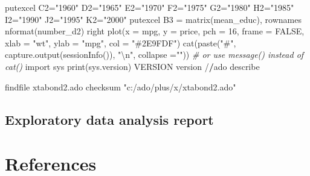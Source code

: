 \documentclass[
  12pt,
]{article}
\newenvironment{Shaded}{\begin{snugshade}}{\end{snugshade}}
\newcommand{\AttributeTok}[1]{\textcolor[rgb]{0.77,0.63,0.00}{#1}}
\newcommand{\CommentTok}[1]{\textcolor[rgb]{0.56,0.35,0.01}{\textit{#1}}}
\newcommand{\ConstantTok}[1]{\textcolor[rgb]{0.00,0.00,0.00}{#1}}
\newcommand{\DecValTok}[1]{\textcolor[rgb]{0.00,0.00,0.81}{#1}}
\newcommand{\ErrorTok}[1]{\textcolor[rgb]{0.64,0.00,0.00}{\textbf{#1}}}
\newcommand{\FunctionTok}[1]{\textcolor[rgb]{0.00,0.00,0.00}{#1}}
\newcommand{\NormalTok}[1]{#1}
\newcommand{\OtherTok}[1]{\textcolor[rgb]{0.56,0.35,0.01}{#1}}
\newcommand{\SpecialCharTok}[1]{\textcolor[rgb]{0.00,0.00,0.00}{#1}}
\newcommand{\StringTok}[1]{\textcolor[rgb]{0.31,0.60,0.02}{#1}}
\begin{document}
\begin{Shaded}
\begin{Highlighting}[]
\NormalTok{    putexcel C2}\OtherTok{=}\StringTok{"1960"}\NormalTok{ D2}\OtherTok{=}\StringTok{"1965"}\NormalTok{ E2}\OtherTok{=}\StringTok{"1970"}\NormalTok{ F2}\OtherTok{=}\StringTok{"1975"}\NormalTok{ G2}\OtherTok{=}\StringTok{"1980"}\NormalTok{ H2}\OtherTok{=}\StringTok{"1985"}\NormalTok{ I2}\OtherTok{=}\StringTok{"1990"}\NormalTok{ J2}\OtherTok{=}\StringTok{"1995"}\NormalTok{ K2}\OtherTok{=}\StringTok{"2000"}
\NormalTok{    putexcel B3 }\OtherTok{=} \FunctionTok{matrix}\NormalTok{(mean\_educ), rownames }\FunctionTok{nformat}\NormalTok{(number\_d2) right}
\FunctionTok{plot}\NormalTok{(}\AttributeTok{x =}\NormalTok{ mpg, }\AttributeTok{y =}\NormalTok{ price,}
     \AttributeTok{pch =} \DecValTok{16}\NormalTok{, }\AttributeTok{frame =} \ConstantTok{FALSE}\NormalTok{,}
     \AttributeTok{xlab =} \StringTok{"wt"}\NormalTok{, }\AttributeTok{ylab =} \StringTok{"mpg"}\NormalTok{, }\AttributeTok{col =} \StringTok{"\#2E9FDF"}\NormalTok{)}
\FunctionTok{cat}\NormalTok{(}\FunctionTok{paste}\NormalTok{(}\StringTok{"\#"}\NormalTok{, }\FunctionTok{capture.output}\NormalTok{(}\FunctionTok{sessionInfo}\NormalTok{()), }\StringTok{"}\SpecialCharTok{\textbackslash{}n}\StringTok{"}\NormalTok{, }\AttributeTok{collapse =}\StringTok{""}\NormalTok{))}
  \CommentTok{\# or use message() instead of cat()}
\NormalTok{import sys}
\FunctionTok{print}\NormalTok{(sys.version)}
\NormalTok{VERSION}
\NormalTok{version}
\SpecialCharTok{/}\ErrorTok{/}\NormalTok{ado describe}

\NormalTok{findfile xtabond2.ado}
\NormalTok{checksum }\StringTok{"c:/ado/plus/x/xtabond2.ado"}
\end{Highlighting}
\end{Shaded}

\hypertarget{exploratory-data-analysis-report}{%
\subsection{Exploratory data analysis report}\label{exploratory-data-analysis-report}}

\hypertarget{references}{%
\section*{References}\label{references}}
\end{document}
